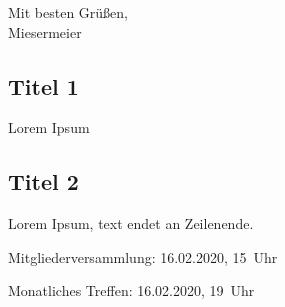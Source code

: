\noindent
Mit besten Grüßen, \\
Miesermeier

\subsection{Titel 1}
Lorem Ipsum

\subsection{Titel 2}
Lorem Ipsum, text endet an Zeilenende.


\begin{termine}
  \item Mitgliederversammlung: 16.02.2020, 15~Uhr
  \item Monatliches Treffen: 16.02.2020, 19~Uhr
\end{termine}
\impressum



